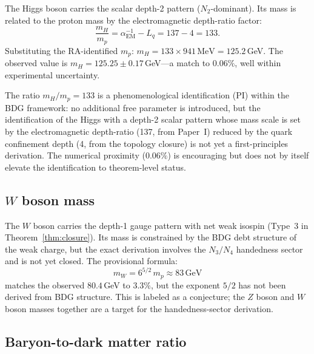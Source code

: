 \documentclass[11pt]{article}
\begin{document}
The Higgs boson carries the scalar depth-2 pattern ($N_2$-dominant). Its mass is related to the proton mass by the electromagnetic depth-ratio factor:
\begin{equation}
\frac{m_H}{m_p} = \alpha_{\mathrm{EM}}^{-1}-L_q = 137-4 = 133.
\end{equation}
Substituting the RA-identified $m_p$: $m_H=133\times 941\,\mathrm{MeV}=125.2$\,GeV. The observed value is $m_H=125.25\pm 0.17$\,GeV---a match to $0.06\%$, well within experimental uncertainty.

The ratio $m_H/m_p=133$ is a phenomenological identification (PI) within the BDG framework: no additional free parameter is introduced, but the identification of the Higgs with a depth-2 scalar pattern whose mass scale is set by the electromagnetic depth-ratio (137, from Paper~I) reduced by the quark confinement depth (4, from the topology closure) is not yet a first-principles derivation. The numerical proximity ($0.06\%$) is encouraging but does not by itself elevate the identification to theorem-level status.

\subsection{$W$ boson mass}

The $W$ boson carries the depth-1 gauge pattern with net weak isospin (Type~3 in Theorem~\ref{thm:closure}). Its mass is constrained by the BDG debt structure of the weak charge, but the exact derivation involves the $N_3/N_4$ handedness sector and is not yet closed. The provisional formula:
\begin{equation}
m_W = 6^{5/2}\,m_p \approx 83\,\mathrm{GeV}
\end{equation}
matches the observed $80.4$\,GeV to $3.3\%$, but the exponent $5/2$ has not been derived from BDG structure. This is labeled as a conjecture; the $Z$ boson and $W$ boson masses together are a target for the handedness-sector derivation.

\subsection{Baryon-to-dark matter ratio}
\end{document}
